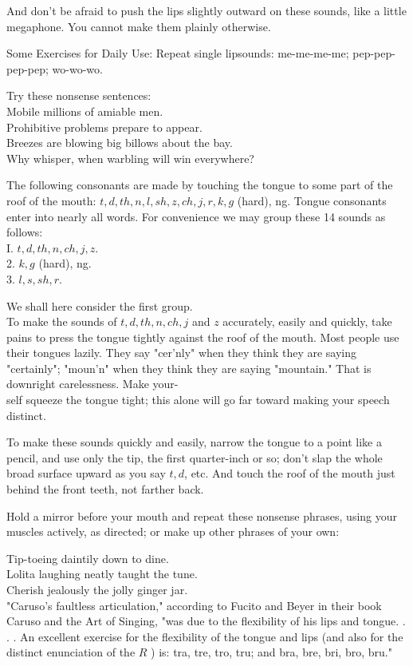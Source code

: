 \documentclass[10pt]{article}
\begin{document}
And don't be afraid to push the lips slightly outward on these sounds, like a little megaphone. You cannot make them plainly otherwise.

Some Exercises for Daily Use: Repeat single lipsounds: me-me-me-me; pep-pep-pep-pep; wo-wo-wo.

Try these nonsense sentences:\\
Mobile millions of amiable men.\\
Prohibitive problems prepare to appear.\\
Breezes are blowing big billows about the bay.\\
Why whisper, when warbling will win everywhere?

The following consonants are made by touching the tongue to some part of the roof of the mouth: $t, d, t h, n, l, s h, z, c h, j, r, k, g$ (hard), ng. Tongue consonants enter into nearly all words. For convenience we may group these 14 sounds as follows:\\
I. $t, d, t h, n, c h, j, z$.\\
2. $k, g$ (hard), ng.\\
3. $l, s, s h, r$.

We shall here consider the first group.\\
To make the sounds of $t, d, t h, n, c h, j$ and $z$ accurately, easily and quickly, take pains to press the tongue tightly against the roof of the mouth. Most people use their tongues lazily. They say "cer'nly" when they think they are saying "certainly"; "moun'n" when they think they are saying "mountain." That is downright carelessness. Make your-\\
self squeeze the tongue tight; this alone will go far toward making your speech distinct.

To make these sounds quickly and easily, narrow the tongue to a point like a pencil, and use only the tip, the first quarter-inch or so; don't slap the whole broad surface upward as you say $t, d$, etc. And touch the roof of the mouth just behind the front teeth, not farther back.

Hold a mirror before your mouth and repeat these nonsense phrases, using your muscles actively, as directed; or make up other phrases of your own:

Tip-toeing daintily down to dine.\\
Lolita laughing neatly taught the tune.\\
Cherish jealously the jolly ginger jar.\\
"Caruso's faultless articulation," according to Fucito and Beyer in their book Caruso and the Art of Singing, "was due to the flexibility of his lips and tongue. . . . An excellent exercise for the flexibility of the tongue and lips (and also for the distinct enunciation of the $R$ ) is: tra, tre, tro, tru; and bra, bre, bri, bro, bru."
\end{document}
